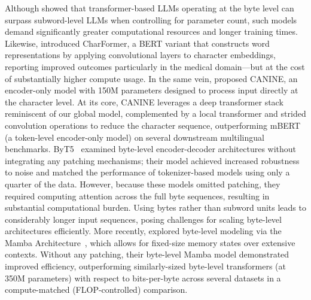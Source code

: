 Although \cite{Choe2019BridgingTG} showed that transformer-based LLMs operating at the byte level can surpass subword-level LLMs when controlling for parameter count, such models demand significantly greater computational resources and longer training times. Likewise, \cite{el2020characterbert} introduced CharFormer, a BERT variant that constructs word representations by applying convolutional layers to character embeddings, reporting improved outcomes particularly in the medical domain—but at the cost of substantially higher compute usage. In the same vein, \cite{clark2022canine} proposed CANINE, an encoder-only model with 150M parameters designed to process input directly at the character level. At its core, CANINE leverages a deep transformer stack reminiscent of our global model, complemented by a local transformer and strided convolution operations to reduce the character sequence, outperforming mBERT (a token-level encoder-only model) on several downstream multilingual benchmarks. ByT5~\citep{xue2022byt5} examined byte-level encoder-decoder architectures without integrating any patching mechanisms; their model achieved increased robustness to noise and matched the performance of tokenizer-based models using only a quarter of the data. However, because these models omitted patching, they required computing attention across the full byte sequences, resulting in substantial computational burden. Using bytes rather than subword units leads to considerably longer input sequences, posing challenges for scaling byte-level architectures efficiently. More recently, \cite{wang2024mambabyte} explored byte-level modeling via the Mamba Architecture~\citep{gu2023mamba}, which allows for fixed-size memory states over extensive contexts. Without any patching, their byte-level Mamba model demonstrated improved efficiency, outperforming similarly-sized byte-level transformers (at 350M parameters) with respect to bits-per-byte across several datasets in a compute-matched (FLOP-controlled) comparison.

